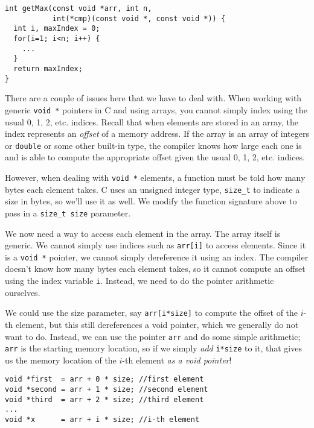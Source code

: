 \begin{verbatim}
int getMax(const void *arr, int n, 
           int(*cmp)(const void *, const void *)) {
  int i, maxIndex = 0;
  for(i=1; i<n; i++) {
    ...
  }
  return maxIndex;
}
\end{verbatim}

There are a couple of issues here that we have to deal with.  When
working with generic \texttt{void *} pointers in C and using arrays, 
you cannot simply index using the usual 0, 1, 2, etc. indices.  Recall that 
when elements are stored in an array, the index represents an \emph{offset} 
of a memory address.  If the array is an array of integers or 
\texttt{double} or some other built-in type, the compiler knows how 
large each one is and is able to compute the appropriate offset given the 
usual 0, 1, 2, etc. indices.
	
However, when dealing with \texttt{void *} elements, a function must 
be told how many bytes each element takes. C uses an unsigned integer type, 
\texttt{size_t} to indicate a size in bytes, so we'll use it as well.
We modify the function signature above to pass in a \texttt{size_t size}
parameter.

We now need a way to access each element in the array.  The array itself
is generic.  We cannot simply use indices such as \texttt{arr[i]}
to access elements.  Since it is a \texttt{void *} pointer, 
we cannot simply dereference it using an index.  The compiler doesn't
know how many bytes each element takes, so it cannot compute an offset
using the index variable \texttt{i}.  Instead, we need to do 
the pointer arithmetic ourselves.

We could use the size parameter, say \texttt{arr[i*size]} to
compute the offset of the $i$-th element, but this still dereferences
a void pointer, which we generally do not want to do.  Instead, we can
use the pointer \texttt{arr} and do some simple arithmetic;
\texttt{arr} is the starting memory location, so if we simply 
\emph{add} \texttt{i*size} to it, that gives us the memory
location of the $i$-th element \emph{as a void pointer}!

\begin{verbatim}
void *first  = arr + 0 * size; //first element
void *second = arr + 1 * size; //second element
void *third  = arr + 2 * size; //third element
...
void *x      = arr + i * size; //i-th element
\end{verbatim}

